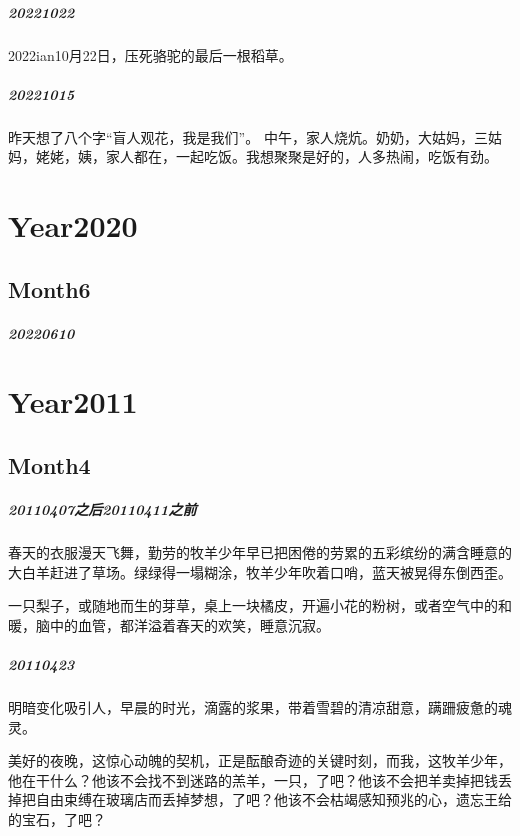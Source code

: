 \documentclass[UTF8]{book}
\begin{document}
\paragraph{20221022}
2022ian10月22日，压死骆驼的最后一根稻草。

\paragraph{20221015}
昨天想了八个字“盲人观花，我是我们”。
中午，家人烧炕。奶奶，大姑妈，三姑妈，姥姥，姨，家人都在，一起吃饭。我想聚聚是好的，人多热闹，吃饭有劲。


\chapter{Year2020}
\section{Month6}
\paragraph{20220610}


\chapter{Year2011}

\section{Month4}
\paragraph{20110407之后20110411之前}

春天的衣服漫天飞舞，勤劳的牧羊少年早已把困倦的劳累的五彩缤纷的满含睡意的大白羊赶进了草场。绿绿得一塌糊涂，牧羊少年吹着口哨，蓝天被晃得东倒西歪。

一只梨子，或随地而生的芽草，桌上一块橘皮，开遍小花的粉树，或者空气中的和暖，脑中的血管，都洋溢着春天的欢笑，睡意沉寂。

\paragraph{20110423}
明暗变化吸引人，早晨的时光，滴露的浆果，带着雪碧的清凉甜意，蹒跚疲惫的魂灵。

美好的夜晚，这惊心动魄的契机，正是酝酿奇迹的关键时刻，而我，这牧羊少年，他在干什么？他该不会找不到迷路的羔羊，一只，了吧？他该不会把羊卖掉把钱丢掉把自由束缚在玻璃店而丢掉梦想，了吧？他该不会枯竭感知预兆的心，遗忘王给的宝石，了吧？
\end{document}
